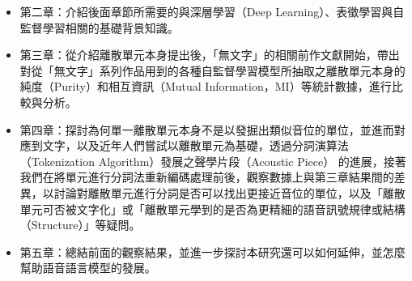 \begin{itemize}
  \itemsep -2pt
  \item 第二章：介紹後面章節所需要的與深層學習（Deep Learning）、表徵學習與自監督學習相關的基礎背景知識。
  \item 第三章：從介紹離散單元本身提出後，「無文字」的相關前作文獻開始，帶出對從「無文字」系列作品用到的各種自監督學習模型所抽取之離散單元本身的純度（Purity）和相互資訊（Mutual Information，MI）等統計數據，進行比較與分析。
  \item 第四章：探討為何單一離散單元本身不是以發掘出類似音位的單位，並進而對應到文字，以及近年人們嘗試以離散單元為基礎，透過分詞演算法（Tokenization Algorithm）發展之聲學片段（Acoustic Piece） 的進展，接著我們在將單元進行分詞法重新編碼處理前後，觀察數據上與第三章結果間的差異，以討論對離散單元進行分詞是否可以找出更接近音位的單位，以及「離散單元可否被文字化」或「離散單元學到的是否為更精細的語音訊號規律或結構（Structure）」等疑問。
  \item 第五章：總結前面的觀察結果，並進一步探討本研究還可以如何延伸，並怎麼幫助語音語言模型的發展。
\end{itemize}
